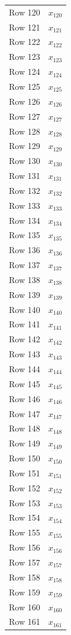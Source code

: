 \documentclass{article}
\begin{document}
\begin{longtable}{lr}
Row 120 & $x_{120}$ \\
Row 121 & $x_{121}$ \\
Row 122 & $x_{122}$ \\
Row 123 & $x_{123}$ \\
Row 124 & $x_{124}$ \\
Row 125 & $x_{125}$ \\
Row 126 & $x_{126}$ \\
Row 127 & $x_{127}$ \\
Row 128 & $x_{128}$ \\
Row 129 & $x_{129}$ \\
Row 130 & $x_{130}$ \\
Row 131 & $x_{131}$ \\
Row 132 & $x_{132}$ \\
Row 133 & $x_{133}$ \\
Row 134 & $x_{134}$ \\
Row 135 & $x_{135}$ \\
Row 136 & $x_{136}$ \\
Row 137 & $x_{137}$ \\
Row 138 & $x_{138}$ \\
Row 139 & $x_{139}$ \\
Row 140 & $x_{140}$ \\
Row 141 & $x_{141}$ \\
Row 142 & $x_{142}$ \\
Row 143 & $x_{143}$ \\
Row 144 & $x_{144}$ \\
Row 145 & $x_{145}$ \\
Row 146 & $x_{146}$ \\
Row 147 & $x_{147}$ \\
Row 148 & $x_{148}$ \\
Row 149 & $x_{149}$ \\
Row 150 & $x_{150}$ \\
Row 151 & $x_{151}$ \\
Row 152 & $x_{152}$ \\
Row 153 & $x_{153}$ \\
Row 154 & $x_{154}$ \\
Row 155 & $x_{155}$ \\
Row 156 & $x_{156}$ \\
Row 157 & $x_{157}$ \\
Row 158 & $x_{158}$ \\
Row 159 & $x_{159}$ \\
Row 160 & $x_{160}$ \\
Row 161 & $x_{161}$ \\

\end{longtable}
\end{document}
